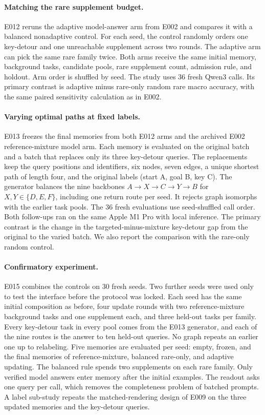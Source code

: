\documentclass[11pt]{article}
\begin{document}
\paragraph{Matching the rare supplement budget.}
E012 reruns the adaptive model-answer arm from E002 and compares it
with a balanced nonadaptive control. For each seed, the control
randomly orders one key-detour and one unreachable supplement across
two rounds. The adaptive arm can pick the same rare family twice.
Both arms receive the same initial memory, background tasks, candidate
pools, rare supplement count, admission rule, and holdout. Arm order is
shuffled by seed. The study uses 36 fresh Qwen3 calls. Its primary
contrast is adaptive minus rare-only random rare macro accuracy, with
the same paired sensitivity calculation as in E002.

\paragraph{Varying optimal paths at fixed labels.}
E013 freezes the final memories from both E012 arms and the archived
E002 reference-mixture model arm. Each memory is evaluated on the
original batch and a batch that replaces only its three key-detour
queries. The replacements keep the query positions and identifiers, six
nodes, seven edges, a unique shortest path of length four, and the
original labels (start A, goal B, key C). The generator balances the
nine backbones $A\to X\to C\to Y\to B$ for $X,Y\in\{D,E,F\}$, including
one return route per seed. It rejects graph isomorphs with the earlier
task pools. The 36 fresh evaluations use seed-shuffled call order. Both
follow-ups
ran on the same Apple M1 Pro with local inference.
The primary contrast is the change in the targeted-minus-mixture
key-detour gap from the original to the varied batch. We also report
the comparison with the rare-only random control.

\paragraph{Confirmatory experiment.}
E015 combines the controls on 30 fresh seeds. Two further seeds were
used only to test the interface before the protocol was locked. Each
seed has the same initial composition as before, four update rounds
with two reference-mixture background tasks and one supplement each,
and three held-out tasks per family. Every key-detour task in every
pool comes from the E013 generator, and each of the nine routes is the
answer to ten held-out queries. No graph repeats an earlier one up to
relabeling. Five memories are evaluated per seed: empty, frozen, and
the final memories of reference-mixture, balanced rare-only, and
adaptive updating. The balanced rule spends two supplements on each
rare family. Only verified model answers enter memory after the initial
examples. The readout asks one query per call, which removes the
completeness problem of batched prompts. A label sub-study repeats the
matched-rendering design of E009 on the three updated memories and the
key-detour queries.
\end{document}
